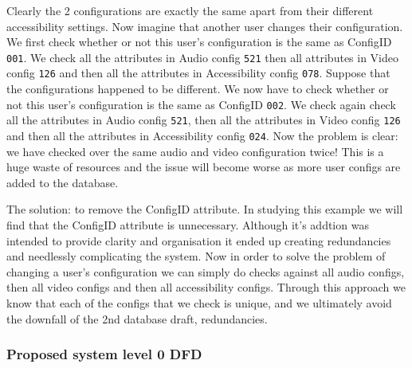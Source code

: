 Clearly the 2 configurations are exactly the same apart from 
their different accessibility settings. Now imagine that 
another user changes their configuration. We first check 
whether or not this user's configuration is the same as
ConfigID \texttt{001}. We check all the attributes in Audio
config \texttt{521} then all attributes in Video config
\texttt{126} and then all the attributes in Accessibility config
\texttt{078}. Suppose that the configurations happened to be 
different. We now have to check whether or not this user's 
configuration is the same as ConfigID \texttt{002}. We check 
again check all the attributes in Audio config \texttt{521},
then all the attributes in Video config \texttt{126} and then
all the attributes in Accessibility config \texttt{024}. Now 
the problem is clear: we have checked over the same audio and 
video configuration twice! This is a huge waste of resources and 
the issue will become worse as more user configs are added to 
the database. \\ \vspace{0.2cm}

The solution: to remove the ConfigID attribute. In studying this 
example we will find that the ConfigID attribute is unnecessary.
Although it's addtion was intended to provide clarity and
organisation it ended up creating redundancies and needlessly
complicating the system. Now in order to solve the problem of 
changing a user's configuration we can simply do checks against
all audio configs, then all video configs and then all
accessibility configs. Through this approach we know that each 
of the configs that we check is unique, and we ultimately avoid 
the downfall of the 2nd database draft, redundancies. 

\subsubsection{Proposed system level 0 DFD}

